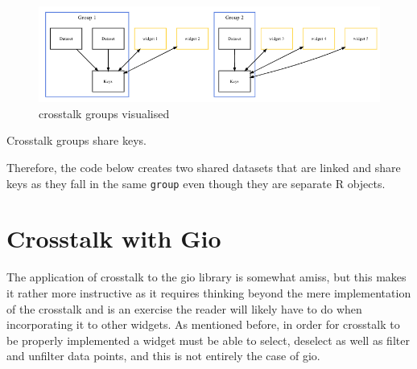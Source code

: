 \documentclass[10pt,]{krantz}
\makeatletter
\newenvironment{Shaded}{\begin{snugshade}}{\end{snugshade}}
\newcommand{\DataTypeTok}[1]{\textcolor[rgb]{0.27,0.27,0.27}{#1}}
\newcommand{\KeywordTok}[1]{\textcolor[rgb]{0.27,0.27,0.27}{\textbf{#1}}}
\newcommand{\NormalTok}[1]{#1}
\newcommand{\OperatorTok}[1]{\textcolor[rgb]{0.43,0.43,0.43}{\textbf{#1}}}
\newcommand{\StringTok}[1]{\textcolor[rgb]{0.5,0.5,0.5}{#1}}
\newenvironment{kframe}{%
\medskip{}
\setlength{\fboxsep}{.8em}
 \def\at@end@of@kframe{}%
 \ifinner\ifhmode%
  \def\at@end@of@kframe{\end{minipage}}%
  \begin{minipage}{\columnwidth}%
 \fi\fi%
 \def\FrameCommand##1{\hskip\@totalleftmargin \hskip-\fboxsep
 \colorbox{shadecolor}{##1}\hskip-\fboxsep
     \hskip-\linewidth \hskip-\@totalleftmargin \hskip\columnwidth}%
 \MakeFramed {\advance\hsize-\width
   \@totalleftmargin\z@ \linewidth\hsize
   \@setminipage}}%
 {\par\unskip\endMakeFramed%
 \at@end@of@kframe}
\renewenvironment{Shaded}{\begin{kframe}}{\end{kframe}}
\newenvironment{rmdblock}[1]
  {
  \begin{itemize}
  \renewcommand{\labelitemi}{
    \raisebox{-.7\height}[0pt][0pt]{
      {\setkeys{Gin}{width=3em,keepaspectratio}\texttt{[image: images/\#1]}}
    }
  }
  \setlength{\fboxsep}{1em}
  \begin{kframe}
  \item
  }
  {
  \end{kframe}
  \end{itemize}
  }
\newenvironment{rmdnote}
  {\begin{rmdblock}{note}}
  {\end{rmdblock}}
\makeatother
\begin{document}
\begin{figure}[H]

{\centering \includegraphics[width=1\linewidth]{images/03-crosstalk-grps} 

}

\caption{crosstalk groups visualised}\label{fig:crosstalk-groups-diagram}
\end{figure}

\begin{rmdnote}
Crosstalk groups share keys.
\end{rmdnote}

Therefore, the code below creates two shared datasets that are linked and share keys as they fall in the same \texttt{group} even though they are separate R objects.

\begin{Shaded}
\end{Shaded}

\hypertarget{linking-widgets-gio}{%
\section{Crosstalk with Gio}\label{linking-widgets-gio}}

The application of crosstalk to the gio library is somewhat amiss, but this makes it rather more instructive as it requires thinking beyond the mere implementation of the crosstalk and is an exercise the reader will likely have to do when incorporating it to other widgets. As mentioned before, in order for crosstalk to be properly implemented a widget must be able to select, deselect as well as filter and unfilter data points, and this is not entirely the case of gio.
\end{document}
